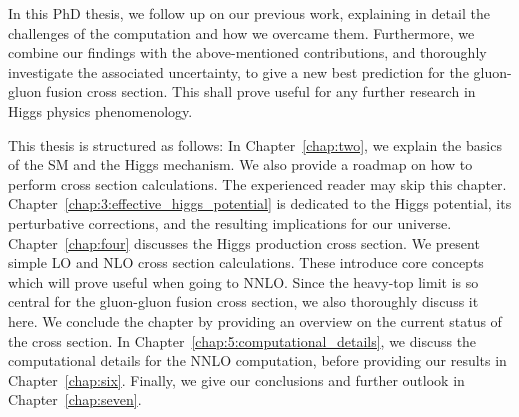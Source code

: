 In this PhD thesis, we follow up on our previous work, explaining in detail the challenges of the computation and how we overcame them. Furthermore, we combine our findings with the above-mentioned contributions, and thoroughly investigate the associated uncertainty, to give a new best prediction for the gluon-gluon fusion cross section. This shall prove useful for any further research in Higgs physics phenomenology.

This thesis is structured as follows: In Chapter~\ref{chap:two}, we explain the basics of the \acs{SM} and the Higgs mechanism. We also provide a roadmap on how to perform cross section calculations. The experienced reader may skip this chapter. Chapter~\ref{chap:3:effective_higgs_potential} is dedicated to the Higgs potential, its perturbative corrections, and the resulting implications for our universe. Chapter~\ref{chap:four} discusses the Higgs production cross section. We present simple \acs{LO} and \acs{NLO} cross section calculations. These introduce core concepts which will prove useful when going to \acs{NNLO}. Since the heavy-top limit is so central for the gluon-gluon fusion cross section, we also thoroughly discuss it here. We conclude the chapter by providing an overview on the current status of the cross section. In Chapter~\ref{chap:5:computational_details}, we discuss the computational details for the \acs{NNLO} computation, before providing our results in Chapter~\ref{chap:six}. Finally, we give our conclusions and further outlook in Chapter~\ref{chap:seven}.
